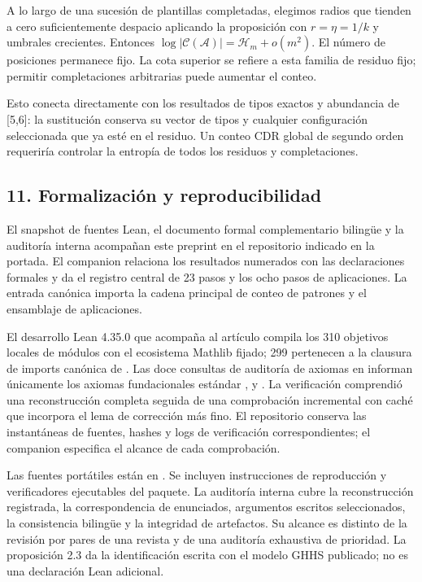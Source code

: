 \documentclass[spanish,11pt,a4paper]{article}
\begin{document}
A lo largo de una sucesión de plantillas completadas, elegimos radios que tienden a cero suficientemente despacio aplicando la proposición con \(r=\eta=1/k\) y umbrales crecientes. Entonces \(\log|\mathcal C(\mathcal A)|=\mathcal H_m+o(m^2)\). El número de posiciones permanece fijo. La cota superior se refiere a esta familia de residuo fijo; permitir completaciones arbitrarias puede aumentar el conteo.

Esto conecta directamente con los resultados de tipos exactos y abundancia de {[}5,6{]}: la sustitución conserva su vector de tipos y cualquier configuración seleccionada que ya esté en el residuo. Un conteo CDR global de segundo orden requeriría controlar la entropía de todos los residuos y completaciones.

\subsection{11. Formalización y reproducibilidad}\label{formalizaciuxf3n-y-reproducibilidad}

El snapshot de fuentes Lean, el documento formal complementario bilingüe y la auditoría interna acompañan este preprint en el repositorio indicado en la portada. El companion relaciona los resultados numerados con las declaraciones formales y da el registro central de 23 pasos y los ocho pasos de aplicaciones. La entrada canónica  importa la cadena principal de conteo de patrones y el ensamblaje de aplicaciones.

El desarrollo Lean 4.35.0 que acompaña al artículo compila los 310 objetivos locales de módulos con el ecosistema Mathlib fijado; 299 pertenecen a la clausura de imports canónica de . Las doce consultas de auditoría de axiomas en  informan únicamente los axiomas fundacionales estándar ,  y . La verificación comprendió una reconstrucción completa seguida de una comprobación incremental con caché que incorpora el lema de corrección más fino. El repositorio conserva las instantáneas de fuentes, hashes y logs de verificación correspondientes; el companion especifica el alcance de cada comprobación.

Las fuentes portátiles están en . Se incluyen instrucciones de reproducción y verificadores ejecutables del paquete. La auditoría interna cubre la reconstrucción registrada, la correspondencia de enunciados, argumentos escritos seleccionados, la consistencia bilingüe y la integridad de artefactos. Su alcance es distinto de la revisión por pares de una revista y de una auditoría exhaustiva de prioridad. La proposición 2.3 da la identificación escrita con el modelo GHHS publicado; no es una declaración Lean adicional.
\end{document}
